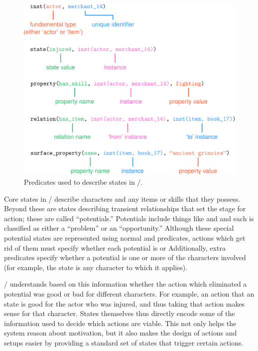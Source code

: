\begin{figure}[!b]
\includegraphics[width=\textwidth]{fig/cropped-dunyazad-states.pdf}
\caption[\dunyazad/'s state predicates]{Predicates used to describe states in \dunyazad/.}
\label{fig:dunyazad-states}
\end{figure}


Core states in \dunyazad/ describe characters and any items or skills that they possess.
%
Beyond these are states describing transient relationships that set the stage for action; these are called ``potentials.''
%
Potentials include things like  and  and each is classified as either a ``problem'' or an ``opportunity.''
%
Although these special potential states are represented using normal   and  predicates, actions which get rid of them must specify whether each potential is   or 
%
Additionally, extra predicates specify whether a potential is  one or more of the characters involved (for example, the  state is  any character to which it applies).


\dunyazad/ understands based on this information whether the action which eliminated a potential was good or bad for different characters.
%
For example, an action that  an  state is good for the actor who was injured, and thus taking that action makes sense for that character.
%
States themselves thus directly encode some of the information used to decide which actions are viable.
%
This not only helps the system reason about motivation, but it also makes the design of actions and setups easier by providing a standard set of states that trigger certain actions.


